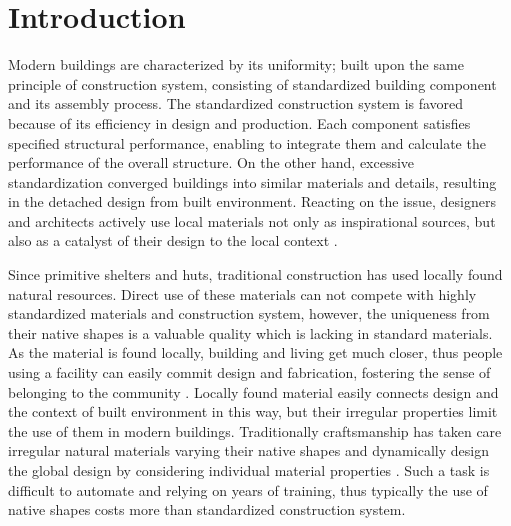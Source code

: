 \section{Introduction}
Modern buildings are characterized by its uniformity; built upon the same principle of construction system, consisting of standardized building component and its assembly process.
The standardized construction system is favored because of its efficiency in design and production.
Each component satisfies specified structural performance, enabling to integrate them and calculate the performance of the overall structure.
On the other hand, excessive standardization converged buildings into similar materials and details, resulting in the detached design from built environment.
Reacting on the issue, designers and architects actively use local materials not only as inspirational sources, but also as a catalyst of their design to the local context \cite{oliver1997encyclopedia}.

Since primitive shelters and huts, traditional construction has used locally found natural resources.
Direct use of these materials can not compete with highly standardized materials and construction system, however, the uniqueness from their native shapes is a valuable quality which is lacking in standard materials.
As the material is found locally, building and living get much closer, thus people using a facility can easily commit design and fabrication, fostering the sense of belonging to the community \cite{}. 
Locally found material easily connects design and the context of built environment in this way, but their irregular properties limit the use of them in modern buildings.
Traditionally craftsmanship has taken care irregular natural materials varying their native shapes and dynamically design the global design by considering individual material properties \cite{}.
Such a task is difficult to automate and relying on years of training, thus typically the use of native shapes costs more than standardized construction system. \\

